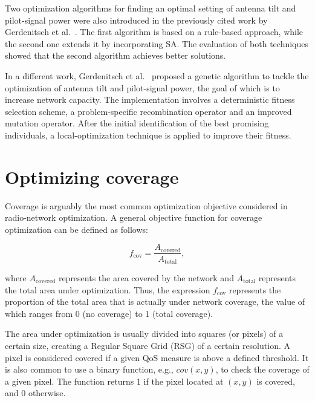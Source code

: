 Two optimization algorithms for finding an optimal setting of antenna
tilt and pilot-signal power were also introduced in the previously
cited work by Gerdenitsch et al.~\cite{Antenna.tilt.and.CPICH:2003}.
The first algorithm is based on a rule-based approach, while the second
one extends it by incorporating SA. The evaluation of both techniques
showed that the second algorithm achieves better solutions.

In a different work, Gerdenitsch et al.~\cite{GA.for.tilt.and.CPICH:2004}
proposed a genetic algorithm to tackle the optimization of antenna
tilt and pilot-signal power, the goal of which is to increase network
capacity. The implementation involves a deterministic fitness selection
scheme, a problem-specific recombination operator and an improved
mutation operator. After the initial identification of the best promising
individuals, a local-optimization technique is applied to improve
their fitness.


\section{Optimizing coverage \label{sec:Optimizing-coverage}}

Coverage is arguably the most common optimization objective considered
in radio-network optimization. A general objective function for coverage
optimization can be defined as follows:

\[
f_{\mathrm{cov}}=\frac{A_{\mathrm{covered}}}{A_{\mathrm{total}}},
\]


\noindent {}

\noindent where $A_{\mathrm{covered}}$ represents the area covered
by the network and $A_{\mathrm{total}}$ represents the total area
under optimization. Thus, the expression $f_{\mathrm{cov}}$ represents
the proportion of the total area that is actually under network coverage,
the value of which ranges from 0 (no coverage) to 1 (total coverage).

The area under optimization is usually divided into squares (or pixels)
of a certain size, creating a Regular Square Grid (RSG)
of a certain resolution. A pixel is considered covered if a given
QoS measure is above a defined threshold. It is also common to use
a binary function, e.g., $cov(x,y)$,
to check the coverage of a given pixel. The function returns 1 if
the pixel located at $(x,y)$ is covered, and 0 otherwise.



